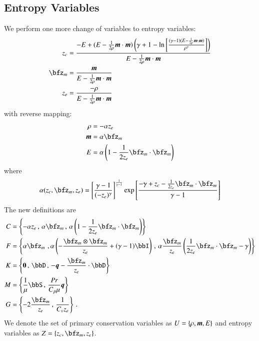 \documentclass[preprint,12pt]{elsarticle}
\begin{document}
\subsection{Entropy Variables}
We perform one more change of variables to entropy variables:
\begin{align*}
z_c&=\frac{-E+(E-\frac{1}{2\rho}\bfm\cdot\bfm)\LRp{\gamma+1-\ln\LRs{\frac{(\gamma-1)(E-\frac{1}{2\rho}\bfm\cdot\bfm)}{\rho^\gamma}}}}
{E-\frac{1}{2\rho}\bfm\cdot\bfm}\\
\bfz_m&=\frac{\bfm}{E-\frac{1}{2\rho}\bfm\cdot\bfm}\\
z_e&=\frac{-\rho}{E-\frac{1}{2\rho}\bfm\cdot\bfm}\\
\end{align*}
with reverse mapping:
\begin{align*}
\rho&=-\alpha z_e\\
\bfm&=\alpha\bfz_m\\
E&=\alpha\LRp{1-\frac{1}{2z_e}\bfz_m\cdot\bfz_m}\\
\end{align*}
where 
\[
\alpha(z_c,\bfz_m,z_e)=\LRs{\frac{\gamma-1}{(-z_e)^\gamma}}^{\frac{1}{\gamma-1}}\exp\LRs{\frac{-\gamma+z_c-\frac{1}{2z_e}\bfz_m\cdot\bfz_m}{\gamma-1}}
\]
The new definitions are
\begin{align*}
C&=\LRc{-\alpha z_e\,,\,
\alpha\bfz_m\,,\,
\alpha\LRp{1-\frac{1}{2z_e}\bfz_m\cdot\bfz_m}}\\
F&=\LRc{\alpha\bfz_m\,\,,
\alpha\LRp{-\frac{\bfz_m\otimes\bfz_m}{z_e}+(\gamma-1)\bbI}\,,\,
\alpha\frac{\bfz_m}{z_e}\LRp{\frac{1}{2z_e}\bfz_m\cdot\bfz_m-\gamma}}\\
K&=\LRc{\boldsymbol 0\,,\,
\bbD\,,\,
-\bfq-\frac{\bfz_m}{z_e}\cdot\bbD}\\
M&=\LRc{\frac{1}{\mu}\bbS\,,\,
\frac{Pr}{C_p\mu}\bfq}\\
G&=\LRc{-2\frac{\bfz_m}{z_e}\,,\,
\frac{1}{C_vz_e}}\,.
\end{align*}
We denote the set of primary conservation variables as $U=\left\{ \rho,\boldsymbol m,E \right\}$ and entropy variables as $Z=\LRc{z_c,\bfz_m,z_e}$.

%                                                                                                                  
%                                                                                                                  
%   
\end{document}
